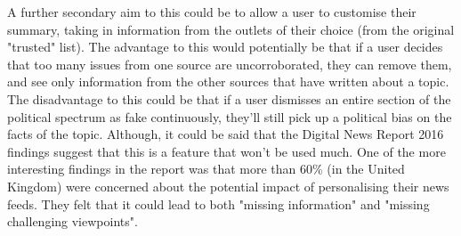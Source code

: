 \documentclass[12pt]{article}
\begin{document}
A further secondary aim to this could be to allow a user to customise their summary, taking in information from the outlets of their choice (from the original "trusted" list). The advantage to this would potentially be that if a user decides that too many issues from one source are uncorroborated, they can remove them, and see only information from the other sources that have written about a topic. The disadvantage to this could be that if a user dismisses an entire section of the political spectrum as fake continuously, they'll still pick up a political bias on the facts of the topic. Although, it could be said that the Digital News Report 2016 findings suggest that this is a feature that won't be used much. One of the more interesting findings in the report was that more than 60\% (in the United Kingdom) were concerned about the potential impact of personalising their news feeds. They felt that it could lead to both "missing information" and "missing challenging viewpoints". 
\end{document}
